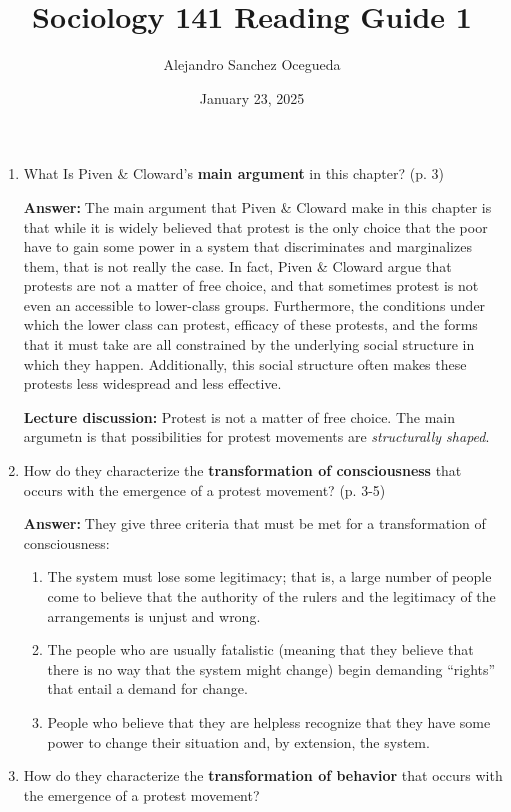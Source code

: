 \documentclass{article}
\title{Sociology 141 Reading Guide 1}
\author{Alejandro Sanchez Ocegueda}
\date{January 23, 2025}
\newcommand{\answer}{\textbf{Answer:}$\;$}
\begin{document}
\maketitle

\begin{enumerate}[label=\arabic*)]
    \item What Is Piven \& Cloward's \textbf{main argument} in this chapter? (p. 3)

    \answer The main argument that Piven \& Cloward make in this chapter is that while it is widely believed that protest is the only choice that the poor have to gain some power in a system that discriminates and marginalizes them, that is not really the case.
    In fact, Piven \& Cloward argue that protests are not a matter of free choice, and that sometimes protest is not even an accessible to lower-class groups.
    Furthermore, the conditions under which the lower class can protest, efficacy of these protests, and the forms that it must take are all constrained by the underlying social structure in which they happen.
    Additionally, this social structure often makes these protests less widespread and less effective.

    \textbf{Lecture discussion:} Protest is not a matter of free choice.
    The main argumetn is that possibilities for protest movements are \textit{structurally shaped}.

    \item How do they characterize the \textbf{transformation of consciousness} that occurs with the emergence of a protest movement? (p. 3-5)

    \answer They give three criteria that must be met for a transformation of consciousness:
    \begin{enumerate}
        \item The system must lose some legitimacy;
        that is, a large number of people come to believe that the authority of the rulers and the legitimacy of the arrangements is unjust and wrong.
        \item The people who are usually fatalistic (meaning that they believe that there is no way that the system might change) begin demanding ``rights'' that entail a demand for change.
        \item People who believe that they are helpless recognize that they have some power to change their situation and, by extension, the system.
    \end{enumerate}

    \item How do they characterize the \textbf{transformation of behavior} that occurs with the emergence of a protest movement?    


\end{enumerate}
\end{document}
